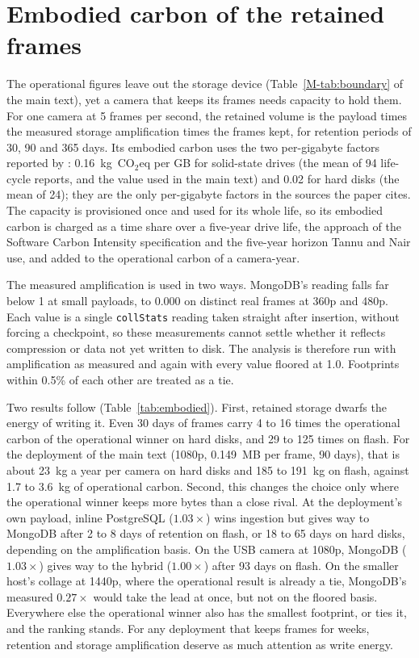 \documentclass[11pt]{article}
\begin{document}
\section{Embodied carbon of the retained frames}\label{sec:embodied}
The operational figures leave out the storage device (Table~\ref{M-tab:boundary} of the main text), yet a camera that keeps its frames needs capacity to hold them. For one camera at 5 frames per second, the retained volume is the payload times the measured storage amplification times the frames kept, for retention periods of 30, 90 and 365 days. Its embodied carbon uses the two per-gigabyte factors reported by \citet{tannu}: 0.16~kg~CO$_2$eq per GB for solid-state drives (the mean of 94 life-cycle reports, and the value used in the main text) and 0.02 for hard disks (the mean of 24); they are the only per-gigabyte factors in the sources the paper cites. The capacity is provisioned once and used for its whole life, so its embodied carbon is charged as a time share over a five-year drive life, the approach of the Software Carbon Intensity specification \citep{sci} and the five-year horizon Tannu and Nair use, and added to the operational carbon of a camera-year.

The measured amplification is used in two ways. MongoDB's reading falls far below 1 at small payloads, to 0.000 on distinct real frames at 360p and 480p. Each value is a single \texttt{collStats} reading taken straight after insertion, without forcing a checkpoint, so these measurements cannot settle whether it reflects compression or data not yet written to disk. The analysis is therefore run with amplification as measured and again with every value floored at 1.0. Footprints within 0.5\% of each other are treated as a tie.

Two results follow (Table~\ref{tab:embodied}). First, retained storage dwarfs the energy of writing it. Even 30 days of frames carry 4 to 16 times the operational carbon of the operational winner on hard disks, and 29 to 125 times on flash. For the deployment of the main text (1080p, 0.149~MB per frame, 90 days), that is about 23~kg a year per camera on hard disks and 185 to 191~kg on flash, against 1.7 to 3.6~kg of operational carbon. Second, this changes the choice only where the operational winner keeps more bytes than a close rival. At the deployment's own payload, inline PostgreSQL ($1.03\times$) wins ingestion but gives way to MongoDB after 2 to 8 days of retention on flash, or 18 to 65 days on hard disks, depending on the amplification basis. On the USB camera at 1080p, MongoDB ($1.03\times$) gives way to the hybrid ($1.00\times$) after 93 days on flash. On the smaller host's collage at 1440p, where the operational result is already a tie, MongoDB's measured $0.27\times$ would take the lead at once, but not on the floored basis. Everywhere else the operational winner also has the smallest footprint, or ties it, and the ranking stands. For any deployment that keeps frames for weeks, retention and storage amplification deserve as much attention as write energy.
\end{document}
